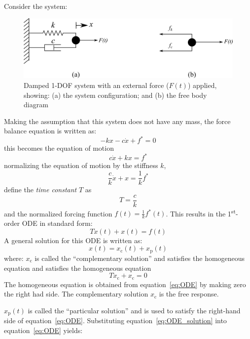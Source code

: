 \documentclass[12pt,letter]{article}
\begin{document}
Consider the system:
\begin{figure}[H]
	\centering
	\includegraphics[]{../figures/1-DOF-spring_dashpot_horizontal_forced_FBD.png}
	\caption{Damped 1-DOF system with an external force ($F(t)$) applied, showing: (a) the system configuration; and (b) the free body diagram}
\end{figure}	
Making the assumption that this system does not have any mass, the force balance equation is written as: 
\begin{equation}
-kx - c\dot{x} + f^* =0
\end{equation}
this becomes the equation of motion
\begin{equation}
c\dot{x} + kx = f^*
\end{equation}
normalizing the equation of motion by the stiffness $k$, 
\begin{equation}
\frac{c}{k}\dot{x} + x = \frac{1}{k}f^*
\end{equation}
define the \emph{time constant} $T$ as 
\begin{equation}
T=\frac{c}{k}
\end{equation}
and the normalized forcing function $f(t) = \frac{1}{k}f^*(t)$. This results in the 1\textsuperscript{st}-order ODE in standard form:
\begin{equation}
T\dot{x}(t) + x(t) = f(t)
\label{eq:ODE}
\end{equation}
A general solution for this ODE is written as:
\begin{equation}
x(t) = x_\text{c}(t)+x_\text{p}(t)
\label{eq:ODE_solution}
\end{equation}
where: $x_\text{c}$ is called the ``complementary solution'' and satisfies the homogeneous equation and satisfies the homogeneous equation 
\begin{equation}
T\dot{x}_\text{c} + x_\text{c} = 0
\end{equation}
The homogeneous equation is obtained from equation~\ref{eq:ODE} by making zero the right had side.  The complementary solution $x_\text{c}$ is the free response.

$x_\text{p}(t)$  is called the ``particular solution'' and is used to satisfy the right-hand side of equation~\ref{eq:ODE}. Substituting equation~\ref{eq:ODE_solution} into equation~\ref{eq:ODE} yields:
\end{document}
